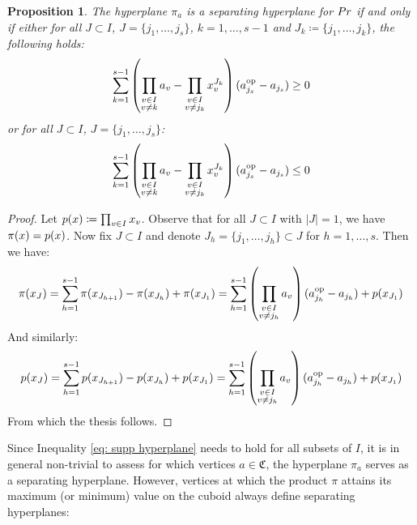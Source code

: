 \documentclass{article}
\newtheorem{proposition}[theorem]{Proposition}
\begin{document}
\begin{proposition}
	\label{prop: sufficient and necessary sep hyperplane}
	The hyperplane \(\pi_a\) is a separating hyperplane for \(Pr\) if and only if either for all \(J \subset I\), \(J = \{j_1,\ldots,j_s\}\), \(k = 1,\ldots,s-1\) and \(J_k \coloneqq \{j_1,\ldots,j_k\}\), the following holds:
	\begin{equation}
		\sum_{k = 1}^{s-1} \left(\prod_{\substack{v \in I \\ v \neq k}}a_v - \prod_{\substack{v \in I \\ v \neq j_k}}{x^{J_k}_v}\right) (a^{\text{op}}_{j_s}-a_{j_s})\geq 0
	\end{equation}
	or for all \(J \subset I\), \(J = \{j_1,\ldots,j_s\}\): 
	\begin{equation}
		\sum_{k = 1}^{s-1} \left(\prod_{\substack{v \in I \\ v \neq k}}a_v - \prod_{\substack{v \in I \\ v \neq j_k}}x^{J_k}_v\right) (a^{\text{op}}_{j_s}-a_{j_s})\leq 0
	\end{equation}
	
\end{proposition}
\begin{proof}

Let \(p(x) \coloneqq \prod_{v \in I}x_v\).	Observe that for all \(J \subset I\) with \(|J| = 1\), we have \(\pi(x) = p(x)\).
%
 Now fix \(J \subset I\) and denote \(J_h = \{j_1,\ldots,j_h\} \subset J\) for \(h=1,\ldots,s\).
	Then we have:
	\begin{equation}
		\label{eq: supp hyperplane}
		\pi(x_J) = \sum_{h=1}^{s-1} \pi({x_{J_{h+1}}}) - \pi({x_{J_{h}}}) + \pi({x_{J_1}}) = \sum_{h=1}^{s-1}  \left(\prod_{\substack{v \in I \\ v \neq j_h}}a_v\right)(a^{\text{op}}_{j_h}-a_{j_h}) + p({x_{J_1}})
	\end{equation}
	And similarly:
	\begin{equation}
		p({x_J})  = \sum_{h=1}^{s-1} p({x_{J_{h+1}}}) - p({x_{J_{h}}}) + p({x_{J_1}}) = \sum_{h=1}^{s-1}  \left(\prod_{\substack{v \in I \\ v \neq j_h}} a_v\right)(a^{\text{op}}_{j_h}-a_{j_h}) + p({x_{J_1}})
	\end{equation}
	From which the thesis follows.
	\end{proof}
Since Inequality \eqref{eq: supp hyperplane} needs to hold for all subsets of \(I\), it is in general non-trivial to assess for which vertices \(a \in \mathfrak{C}\), the hyperplane \(\pi_a\) serves as a separating hyperplane. 
However, vertices at which the product \(\pi\) attains its maximum (or minimum) value on the cuboid always define separating hyperplanes:
\end{document}
